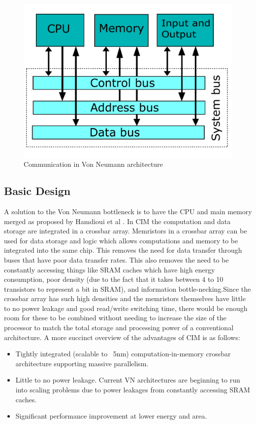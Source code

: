 \documentclass{sig-alternate}
\begin{document}
\begin{figure}
  \includegraphics[width=\linewidth]{Computer_system_bus.pdf}
  \caption{Communication in Von Neumann architecture}
  \label{fig:crossbar}
\end{figure}


\subsection{Basic Design}
A solution to the Von Neumann bottleneck is to have the CPU and main memory merged as proposed by Hamdioui et al \cite{Hamdioui:2015:MBC:2755753.2757210}.  In CIM the computation and data storage are integrated in a crossbar array.  Memristors in a crossbar array can be used for data storage and logic which allows computations and memory to be integrated into the same chip.  This removes the need for data transfer through buses that have poor data transfer rates.  This also removes the need to be constantly accessing things like SRAM caches which have high energy consumption, poor density (due to the fact that it takes between 4 to 10 transistors to represent a bit in SRAM), and information bottle-necking.Since the crossbar array has such high densities and the memristors themselves have little to no power leakage and good read/write switching time, there would be enough room for these to be combined without needing to increase the size of the processor to match the total storage and processing power of a conventional architecture.
A more succinct overview of the advantages of CIM is as follows:
\begin{itemize}
\item Tightly integrated (scalable to ~5nm) computation-in-memory crossbar
architecture supporting massive parallelism.

\item Little to no power leakage.  Current VN architectures are beginning to run into scaling problems due to power leakages from constantly accessing SRAM caches.

\item Significant performance improvement at lower energy and area.
\end{itemize} 
\end{document}
